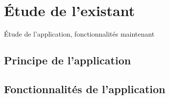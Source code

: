 \chapter{Étude de l’existant}

Étude de l'application, fonctionnalités maintenant 

    \section{Principe de l'application}

    \section{Fonctionnalités de l'application}